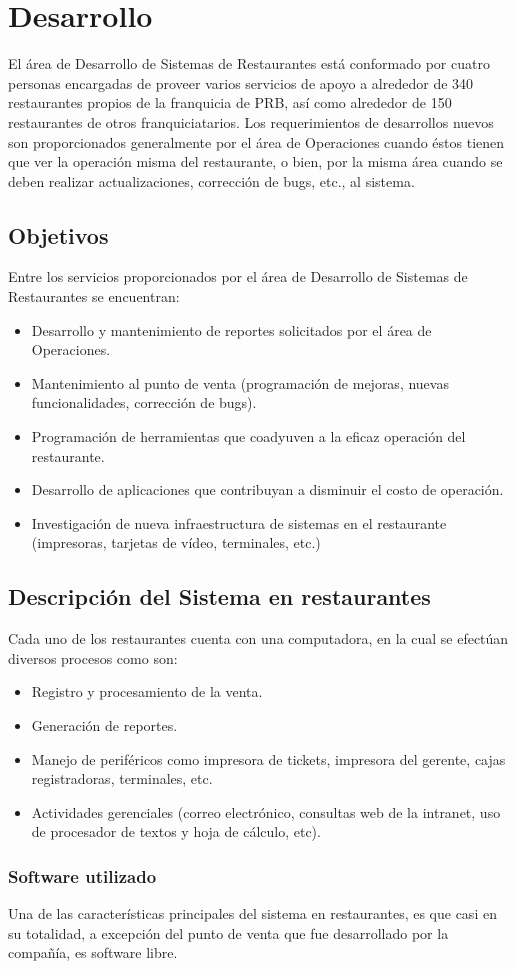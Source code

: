 
\chapter{Desarrollo}
\label{chap:desarrollo}

El área de Desarrollo de Sistemas de Restaurantes está conformado por cuatro personas encargadas de proveer varios servicios de apoyo a alrededor de 340 restaurantes propios de la franquicia de PRB, así como alrededor de 150 restaurantes de otros franquiciatarios. Los requerimientos de desarrollos nuevos son proporcionados generalmente por el área de Operaciones cuando éstos tienen que ver la operación misma del restaurante, o bien, por la misma área cuando se deben realizar actualizaciones, corrección de bugs, etc., al sistema.

\section{Objetivos}
\label{sec:objetivos}

Entre los servicios proporcionados por el área de Desarrollo de Sistemas de Restaurantes se encuentran:

\begin{itemize}
 \item Desarrollo y mantenimiento de reportes solicitados por el área de Operaciones.
 \item Mantenimiento al punto de venta (programación de mejoras, nuevas funcionalidades, corrección de bugs).
 \item Programación de herramientas que coadyuven a la eficaz operación del restaurante.
 \item Desarrollo de aplicaciones que contribuyan a disminuir el costo de operación.
 \item Investigación de nueva infraestructura de sistemas en el restaurante (impresoras, tarjetas de vídeo, terminales, etc.)
\end{itemize}

\section{Descripción del Sistema en restaurantes}
\label{sec:descripcion}

Cada uno de los restaurantes cuenta con una computadora, en la cual se efectúan diversos procesos como son:

\begin{itemize}
 \item Registro y procesamiento de la venta.
 \item Generación de reportes.
 \item Manejo de periféricos como impresora de tickets, impresora del gerente, cajas registradoras, terminales, etc.
 \item Actividades gerenciales (correo electrónico, consultas web de la intranet, uso de procesador de textos y hoja de cálculo, etc).
\end{itemize}

\subsection{Software utilizado}
\label{subsec:software}

Una de las características principales del sistema en restaurantes, es que casi en su totalidad, a excepción del punto de venta que fue desarrollado por la compañía, es software libre.
